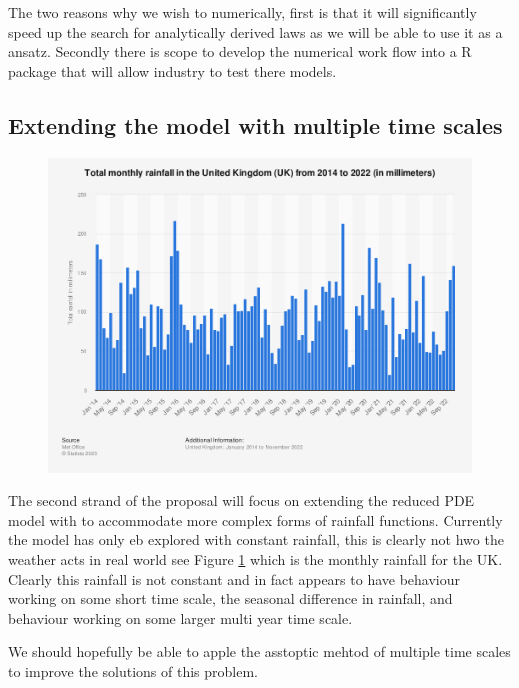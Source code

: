\documentclass[11pt]{article}
\begin{document}
\qquad The two reasons why we wish to numerically, first is that it will significantly speed up the search for analytically derived laws as we will be able to use it as a ansatz. Secondly there is scope to develop the numerical work flow into a R package that will allow industry to test there models.



\subsection{Extending the model with multiple time scales}

\begin{minipage}{0.45\textwidth}
    \begin{figure}[H]
    \centering
    \includegraphics[width=\textwidth]{Figs/Rainfall.png}
    \label{fig:rainfall}
    \end{figure}
\end{minipage}
\hspace{0.05\textwidth}
\indent\begin{minipage}{0.45\textwidth}
    The second strand of the proposal will focus on extending the reduced PDE model with to accommodate more complex forms of rainfall functions. Currently the model has only eb explored with constant rainfall, this is clearly not hwo the weather acts in real world see Figure \ref{fig:rainfall} which is the monthly rainfall for the UK. 
    Clearly this rainfall is not constant and in fact appears to have behaviour working on some short time scale, the seasonal difference in rainfall, and behaviour working on some larger multi year time scale.

    \qquad We should hopefully be able to apple the asstoptic mehtod of multiple time scales to improve the solutions of this problem.
\end{minipage}
\end{document}
